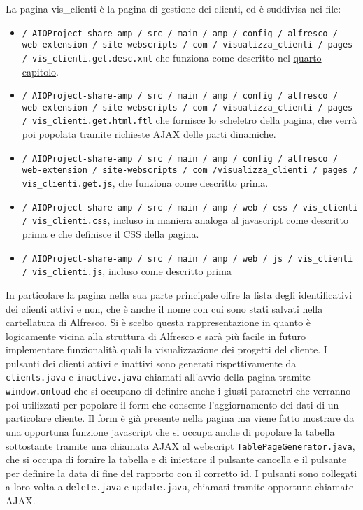 La pagina vis\_clienti è la pagina di gestione dei clienti, ed è suddivisa nei file:
\begin{itemize}
\item \texttt{/ AIOProject-share-amp / src / main / amp / config / alfresco / web-extension / site-webscripts / com / visualizza\_clienti / pages / vis\_clienti.get.desc.xml} che funziona come descritto nel \hyperref[cap:architettura]{ quarto  capitolo}.
\item \texttt{/ AIOProject-share-amp / src / main / amp / config / alfresco / web-extension / site-webscripts / com / visualizza\_clienti / pages / vis\_clienti.get.html.ftl} che fornisce lo scheletro della pagina, che verrà poi popolata tramite richieste AJAX delle parti dinamiche.
\item \texttt{/ AIOProject-share-amp / src / main / amp / config / alfresco / web-extension / site-webscripts / com  /visualizza\_clienti / pages / vis\_clienti.get.js}, che funziona come descritto prima.
\item \texttt{/ AIOProject-share-amp / src / main / amp / web / css / vis\_clienti / vis\_clienti.css}, incluso in maniera analoga al javascript come descritto prima e che definisce il CSS della pagina.
\item \texttt{/ AIOProject-share-amp / src / main / amp / web / js / vis\_clienti / vis\_clienti.js}, incluso come descritto prima
\end{itemize}
In particolare la pagina nella sua parte principale offre la lista degli identificativi dei clienti attivi e non, che è anche il nome con cui sono stati salvati nella cartellatura di Alfresco. Si è scelto questa rappresentazione in quanto è logicamente vicina alla struttura di Alfresco e sarà più facile in futuro implementare funzionalità quali la visualizzazione dei progetti del cliente.  I pulsanti dei clienti attivi e inattivi sono generati rispettivamente da \texttt{clients.java}  e  \texttt{inactive.java}  chiamati all’avvio della pagina tramite \texttt{window.onload} che si occupano di definire anche i giusti parametri che verranno poi utilizzati per popolare il form che consente l’aggiornamento dei dati di un particolare cliente. Il form è già presente nella pagina ma viene fatto mostrare da una opportuna funzione javascript che si occupa anche di popolare la tabella sottostante tramite una chiamata AJAX al webscript \texttt{TablePageGenerator.java}, che si occupa di fornire la tabella e di iniettare il pulsante cancella e il pulsante  per definire  la data di fine del rapporto  con il corretto id. I pulsanti sono collegati a loro volta a \texttt{delete.java} e \texttt{update.java}, chiamati tramite opportune chiamate AJAX.

